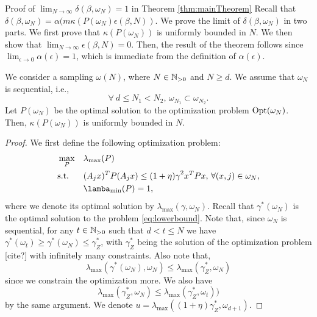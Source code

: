 \begin{subsection}{Proof of  $\lim_{N \to \infty}\delta(\beta, \omega_N) = 1$ in Theorem \ref{thm:mainTheorem}} \label{app:delta}
Recall that $\delta(\beta, \omega_N) = \alpha(m\kappa(P(\omega_N) \epsilon(\beta,N)).$
We prove the limit of $\delta(\beta, \omega_N)$ in two parts. We first prove that $\kappa(P(\omega_N))$ is uniformly bounded in $N$. We then show that $\lim_{N \to \infty} \epsilon(\beta,N) = 0$. Then, the result of the theorem follows since $\lim_{\epsilon \to 0}\alpha(\epsilon) = 1$, which is immediate from the definition of $\alpha(\epsilon)$.

\begin{lemma}\label{lem:bounded} We consider a sampling $\omega(N)$, where $N \in \mathbb{N}_{>0}$ and $N \geq d$. We assume that $\omega_N$ is sequential, i.e., $$\forall\ d \leq N_1  < N_2,\, \omega_{N_1} \subset \omega_{N_2}.$$ Let $P(\omega_N)$ be the optimal solution to the optimization problem $\text{Opt}(\omega_N)$. Then, $\kappa(P(\omega_N))$ is uniformly bounded in $N$.
\end{lemma}

\begin{proof}We first define the following optimization problem:
\begin{equation}\label{eqn:appendix}
\begin{aligned}
& \max_{P} & & \lambda_{\max}(P) \\
& \text{s.t.} 
&  & (A_j x)^TP(A_j x) \leq {(1 +\eta)\gamma}^2 x^TPx,\,\forall (x, j) \in \omega_N, \\
& && \lamba_{\min}(P) = 1, \\
\end{aligned}
\end{equation}
where we denote its optimal solution by $\lambda_{\max}(\gamma , \omega_N)$.
Recall that $\gamma^*(\omega_N)$ is the optimal solution to the problem \eqref{eq:lowerbound}. Note that, since $\omega_N$ is sequential, for any $t \in \mathbb{N}_{>0}$ such that \mbox{$d < t \leq N$} we have \mbox{$\gamma^*(\omega_t) \geq \gamma^*(\omega_N) \leq \gamma^{*}_{Z}$}, with $\gamma^{*}_Z$ being the solution of the optimization problem [cite?] with infinitely many constraints. Also note that,
\begin{equation*}\lambda_{\max}(\gamma^*(\omega_N), \omega_N) \leq \lambda_{\max}(\gamma^{*}_Z, \omega_N)
\end{equation*}
since we constrain the optimization more.
We also have \begin{equation*}\lambda_{\max}(\gamma^{*}_Z, \omega_N) \leq \lambda_{\max}(\gamma^{*}_Z, \omega_t))
\end{equation*}
by the same argument. We denote $u = \lambda_{\max}((1+\eta)\gamma^{*}_Z, \omega_{d+1})$.


\end{proof}
\end{subsection}
